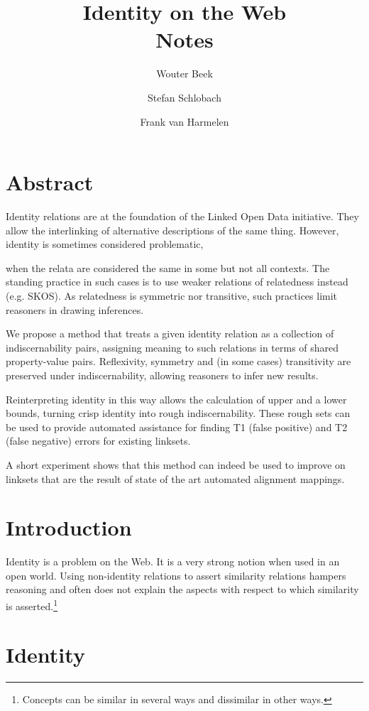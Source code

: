 \documentclass[11pt,a4paper,notitlepage,onecolumn,twoside]{article}
\title{Identity on the Web \\ Notes}
\author{Wouter Beek \and Stefan Schlobach \and Frank van Harmelen}
\begin{document}
\maketitle

\section{Abstract}

Identity relations are at the foundation of the Linked Open Data initiative. They allow the interlinking of alternative descriptions of the same thing. However, identity is sometimes considered problematic,

when the relata are considered the same in some but not all contexts. The standing practice in such cases is to use weaker relations of relatedness instead (e.g. SKOS). As relatedness is symmetric nor transitive, such practices limit reasoners in drawing inferences.

We propose a method that treats a given identity relation as a collection of indiscernability pairs, assigning meaning to such relations in terms of shared property-value pairs. Reflexivity, symmetry and (in some cases) transitivity are preserved under indiscernability, allowing reasoners to infer new results.

Reinterpreting identity in this way allows the calculation of upper and a lower bounds, turning crisp identity into rough indiscernability. These rough sets can be used to provide automated assistance for finding T1 (false positive) and T2 (false negative) errors for existing linksets.

A short experiment shows that this method can indeed be used to improve on linksets that are the result of state of the art automated alignment mappings.

\section{Introduction}

Identity is a problem on the Web. It is a very strong notion when used in an
open world. Using non-identity relations to assert similarity relations
hampers reasoning and often does not explain the aspects with respect to
which similarity is asserted.\footnote{Concepts can be similar in several
ways and dissimilar in other ways.}

\section{Identity}
\end{document}
